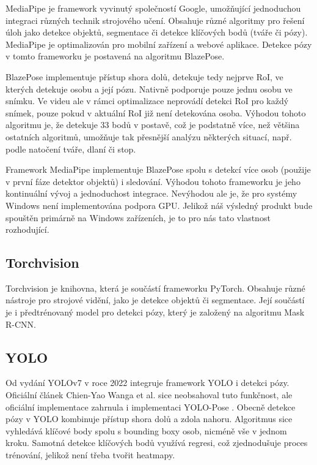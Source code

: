 MediaPipe je framework vyvinutý společností Google, umožňující jednoduchou
integraci různých technik strojového učení. Obsahuje různé algoritmy pro řešení
úloh jako detekce objektů, segmentace či detekce klíčových bodů (tváře či
pózy). MediaPipe je optimalizován pro mobilní zařízení a webové aplikace.
Detekce pózy v tomto frameworku je postavená na algoritmu BlazePose.

BlazePose implementuje přístup shora dolů, detekuje tedy nejprve RoI, ve
kterých detekuje osobu a její pózu. Nativně podporuje pouze jednu osobu ve
snímku. Ve videu ale v rámci optimalizace neprovádí detekci RoI pro každý
snímek, pouze pokud v aktuální RoI již není detekována osoba. Výhodou tohoto
algoritmu je, že detekuje 33 bodů v postavě, což je podstatně více, než většina
ostatních algoritmů, umožňuje tak přesnější analýzu některých situací, např.
podle natočení tváře, dlaní či stop.

Framework MediaPipe implementuje BlazePose spolu s detekcí více osob (použije v
první fáze detektor objektů) i sledování. Výhodou tohoto frameworku je jeho
kontinuální vývoj a jednoduchost integrace. Nevýhodou ale je, že pro systémy
Windows není implementována podpora GPU. Jelikož náš výsledný produkt bude
spouštěn primárně na Windows zařízeních, je to pro nás tato vlastnost
rozhodující.

\subsection{Torchvision}

Torchvision je knihovna, která je součástí frameworku PyTorch. Obsahuje různé
nástroje pro strojové vidění, jako je detekce objektů či segmentace. Její
součástí je i předtrénovaný model pro detekci pózy, který je založený na
algoritmu Mask R-CNN.

\subsection{YOLO}

Od vydání YOLOv7 v roce 2022 integruje framework YOLO i detekci pózy. Oficiální
článek Chien-Yao Wanga et al. \cite{yolov7} sice neobsahoval tuto funkčnost,
ale oficiální implementace zahrnula i implementaci YOLO-Pose \cite{yolo-pose}.
Obecně detekce pózy v YOLO kombinuje přístup shora dolů a zdola nahoru.
Algoritmus sice vyhledává klíčové body spolu s bounding boxy osob, nicméně vše
v jednom kroku. Samotná detekce klíčových bodů využívá regresi, což
zjednodušuje proces trénování, jelikož není třeba tvořit heatmapy.

